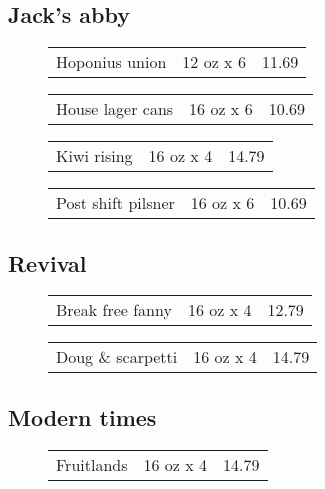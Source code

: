 \documentclass{article}%
\begin{document}
\begin{multicols}{3}
\subsection*{Jack's abby}%
\begin{description}%
\item[]%
\begin{tabular}{l c r}%
Hoponius union&12 oz x 6&11.69\\%
\end{tabular}%
\item[]%
\begin{tabular}{l c r}%
House lager cans&16 oz x 6&10.69\\%
\end{tabular}%
\item[]%
\begin{tabular}{l c r}%
Kiwi rising&16 oz x 4&14.79\\%
\end{tabular}%
\item[]%
\begin{tabular}{l c r}%
Post shift pilsner&16 oz x 6&10.69\\%
\end{tabular}%
\end{description}

%
\subsection*{Revival}%
\begin{description}%
\item[]%
\begin{tabular}{l c r}%
Break free fanny&16 oz x 4&12.79\\%
\end{tabular}%
\item[]%
\begin{tabular}{l c r}%
Doug \& scarpetti&16 oz x 4&14.79\\%
\end{tabular}%
\end{description}

%
\subsection*{Modern times}%
\begin{description}%
\item[]%
\begin{tabular}{l c r}%
Fruitlands&16 oz x 4&14.79\\%
\end{tabular}%
\end{description}


\end{multicols}
\end{document}
